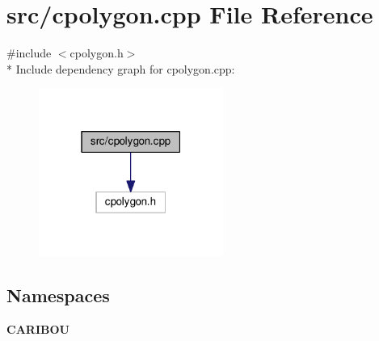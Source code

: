 \section{src/cpolygon.cpp File Reference}
\label{cpolygon_8cpp}
{\ttfamily \#include $<$cpolygon.\+h$>$}\\*
Include dependency graph for cpolygon.\+cpp\+:
\nopagebreak
\begin{figure}[H]
\begin{center}
\leavevmode
\includegraphics[width=171pt]{cpolygon_8cpp__incl}
\end{center}
\end{figure}
\subsection*{Namespaces}
\begin{DoxyCompactItemize}
\item 
 {\bf C\+A\+R\+I\+B\+OU}
\end{DoxyCompactItemize}
